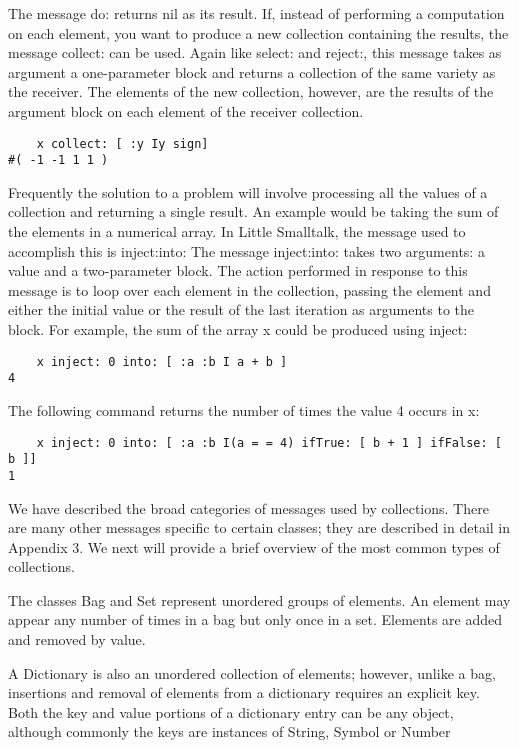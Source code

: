 The message do: returns nil as its result. If, instead of performing a
computation on each element, you want to produce a new collection containing the results, the message collect: can be used. Again like select: and
reject:, this message takes as argument a one-parameter block and returns
a collection of the same variety as the receiver. The elements of the new
collection, however, are the results of the argument block on each element
of the receiver collection.
\begin{lstlisting}
    x collect: [ :y Iy sign]
#( -1 -1 1 1 )
\end{lstlisting}

Frequently the solution to a problem will involve processing all the
values of a collection and returning a single result. An example would be
taking the sum of the elements in a numerical array. In Little Smalltalk,
the message used to accomplish this is inject:into: The message inject:into:
takes two arguments: a value and a two-parameter block. The action performed in response to this message is to loop over each element in the
collection, passing the element and either the initial value or the result of
the last iteration as arguments to the block. For example, the sum of the
array x could be produced using inject:
\begin{lstlisting}
    x inject: 0 into: [ :a :b I a + b ]
4
\end{lstlisting}
The following command returns the number of times the value 4 occurs
in x:
\begin{lstlisting}
    x inject: 0 into: [ :a :b I(a = = 4) ifTrue: [ b + 1 ] ifFalse: [ b ]]
1
\end{lstlisting}

We have described the broad categories of messages used by collections. There are many other messages specific to certain classes; they are
described in detail in Appendix 3. We next will provide a brief overview
of the most common types of collections.

The classes Bag and Set represent unordered groups of elements. An
element may appear any number of times in a bag but only once in a set.
Elements are added and removed by value.

A Dictionary is also an unordered collection of elements; however,
unlike a bag, insertions and removal of elements from a dictionary requires
an explicit key. Both the key and value portions of a dictionary entry can
be any object, although commonly the keys are instances of String, Symbol or Number

